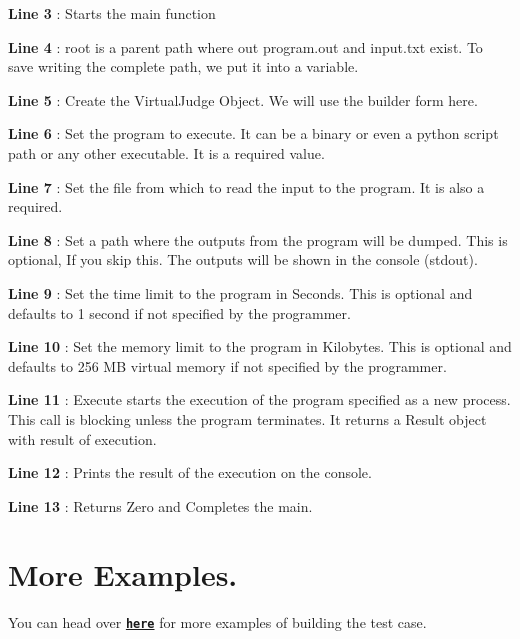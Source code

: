 {\bfseries Line 3 } \+: Starts the main function

{\bfseries Line 4 } \+: root is a parent path where out {\ttfamily program.\+out} and {\ttfamily input.\+txt} exist. To save writing the complete path, we put it into a variable.

{\bfseries Line 5 } \+: Create the Virtual\+Judge Object. We will use the builder form here.

{\bfseries Line 6 } \+: Set the program to execute. It can be a binary or even a python script path or any other executable. It is a required value.

{\bfseries Line 7 } \+: Set the file from which to read the input to the program. It is also a required.

{\bfseries Line 8 } \+: Set a path where the outputs from the program will be dumped. This is optional, If you skip this. The outputs will be shown in the console (stdout).

{\bfseries Line 9 } \+: Set the time limit to the program in Seconds. This is optional and defaults to 1 second if not specified by the programmer.

{\bfseries Line 10 } \+: Set the memory limit to the program in Kilobytes. This is optional and defaults to 256 MB virtual memory if not specified by the programmer.

{\bfseries Line 11 } \+: Execute starts the execution of the program specified as a new process. This call is blocking unless the program terminates. It returns a Result object with result of execution.

{\bfseries Line 12 } \+: Prints the result of the execution on the console.

{\bfseries Line 13 } \+: Returns Zero and Completes the main. 

\hypertarget{index_more_example}{}\section{More Examples.}\label{index_more_example}
You can head over \href{https://github.com/coder3101/testcaser/tree/master/examples}{\tt {\bfseries here}} for more examples of building the test case. 